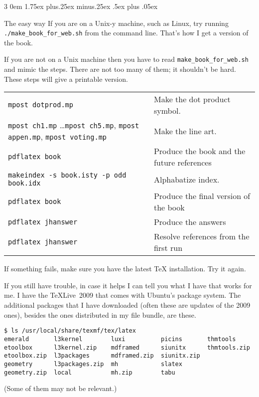 \documentclass[titlepage]{article}
\makeatletter
\renewcommand{\subsubsection}{\@startsection{subsubsection}%
  {3}%
  {0em}%
  {1.75ex plus.25ex minus.25ex}%
  {.5ex plus .05ex}%
  {\bfseries\raggedright}}
\makeatother
\begin{document}
\subsubsection{The easy way}
If you are on a Unix-y machine, such as Linux, 
try running \verb!./make_book_for_web.sh! from the command line.
That's how I get a version of the book.

If you are not on a Unix machine then you have to read 
\verb!make_book_for_web.sh! and mimic the steps.
There are not too many of them; it shouldn't be hard.
These steps will give a printable version.  
\begin{center}
  \begin{tabular}{ll}
    \verb!mpost dotprod.mp!  &Make the dot product symbol.        \\ 
    \verb!mpost ch1.mp! \ldots \verb!mpost ch5.mp!, \verb!mpost appen.mp!, \verb!mpost voting.mp!  &Make the line art. \\
    \verb!pdflatex book!  &Produce the book and the future references       \\
    \verb!makeindex -s book.isty -p odd book.idx!  &Alphabatize index.  \\ 
    \verb!pdflatex book!  &Produce the final version of the book         \\
    \verb!pdflatex jhanswer!  &Produce the answers               \\
    \verb!pdflatex jhanswer!  &Resolve references from the first run  %
  \end{tabular}
\end{center}

If something fails, make sure you have the latest \TeX{} installation.
Try it again.

If you still have trouble, in case it helps I can tell you what I have that 
works for me.
I have the \TeX{}Live~2009 that comes with Ubuntu's package system.
The additional packages that I have downloaded (often these are updates
of the 2009 ones), 
besides the ones distributed in my file bundle, are these.
\begin{verbatim}
$ ls /usr/local/share/texmf/tex/latex
emerald       l3kernel        luxi          picins       thmtools
etoolbox      l3kernel.zip    mdframed      siunitx      thmtools.zip
etoolbox.zip  l3packages      mdframed.zip  siunitx.zip
geometry      l3packages.zip  mh            slatex
geometry.zip  local           mh.zip        tabu
\end{verbatim}
(Some of them may not be relevant.)
\end{document}
